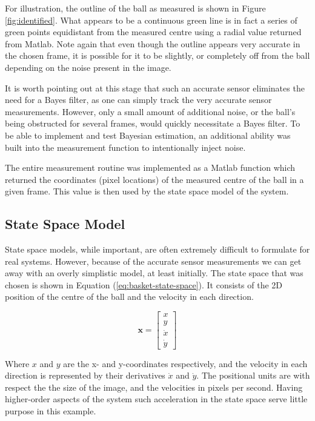 For illustration, the outline of the ball as measured is shown in Figure
\ref{fig:identified}. What appears to be a continuous green line is in fact
a series of green points equidistant from the measured centre using a radial
value returned from Matlab. Note again that even though the outline appears
very accurate in the chosen frame, it is possible for it to be slightly, or
completely off from the ball depending on the noise present in the image.

It is worth pointing out at this stage that such an accurate sensor eliminates
the need for a Bayes filter, as one can simply track the very accurate sensor
measurements. However, only a small amount of additional noise, or the ball's
being obstructed for several frames, would quickly necessitate a Bayes filter.
To be able to implement and test Bayesian estimation, an additional ability was
built into the measurement function to intentionally inject noise. 

The entire measurement routine was implemented as a Matlab function which
returned the coordinates (pixel locations) of the measured centre of the ball
in a given frame. This value is then used by the state space model of the system.

\subsection{State Space Model}
State space models, while important, are often extremely difficult to formulate
for real systems. However, because of the accurate sensor measurements we can
get away with an overly simplistic model, at least initially. The state space
that was chosen is shown in Equation (\ref{eq:basket-state-space}). It consists
of the 2D position of the centre of the ball and the velocity in each direction.

\begin{equation}\label{eq:basket-state-space}
\mathbf{x} =
\begin{bmatrix}
x \\ y \\ \dot{x} \\ \dot{y}
\end{bmatrix}
\end{equation}

Where $x$ and $y$ are the x- and y-coordinates respectively, and the velocity
in each direction is represented by their derivatives $\dot{x}$ and $\dot{y}$.
The positional units are with respect the the size of the image, and the velocities
in pixels per second. Having higher-order aspects of the system such acceleration
in the state space serve little purpose in this example.

